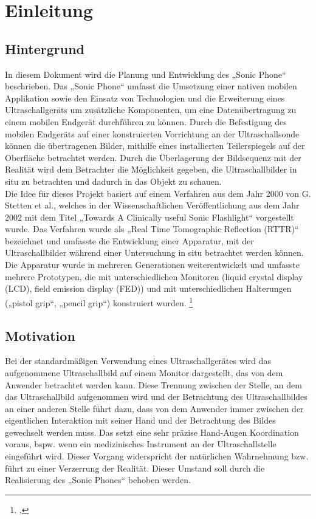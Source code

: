 \chapter{Einleitung}
\section{Hintergrund}
In diesem Dokument wird die Planung und Entwicklung des „Sonic Phone“ beschrieben. Das „Sonic Phone“ umfasst die Umsetzung einer nativen mobilen Applikation sowie den Einsatz von Technologien und die Erweiterung eines Ultraschallgeräts um zusätzliche Komponenten, um eine Datenübertragung zu einem mobilen Endgerät durchführen zu können. Durch die Befestigung des mobilen Endgeräts auf einer konstruierten Vorrichtung an der Ultraschallsonde können die übertragenen Bilder, mithilfe eines installierten Teilerspiegels auf der Oberfläche betrachtet werden. Durch die Überlagerung der Bildsequenz mit der Realität wird dem Betrachter die Möglichkeit gegeben, die Ultraschallbilder in situ zu betrachten und dadurch in das Objekt zu schauen.\\
Die Idee für dieses Projekt basiert auf einem Verfahren aus dem Jahr 2000 von G. Stetten et al., welches in der Wissenschaftlichen Veröffentlichung aus dem Jahr 2002 mit dem Titel „Towards A Clinically useful Sonic Flashlight“ vorgestellt wurde. Das Verfahren wurde als „Real Time Tomographic Reflection (RTTR)“ bezeichnet und umfasste die Entwicklung einer Apparatur, mit der Ultraschallbilder während einer Untersuchung in situ  betrachtet werden können. Die Apparatur wurde in mehreren Generationen weiterentwickelt und umfasste mehrere Prototypen, die mit unterschiedlichen Monitoren (liquid crystal display (LCD), field emission display (FED)) und mit unterschiedlichen Halterungen („pistol grip“, „pencil grip“) konstruiert wurden. \footcite{SonicFlashlight} 

\section{Motivation}
Bei der standardmäßigen Verwendung eines Ultraschallgerätes wird das aufgenommene Ultraschallbild auf einem Monitor dargestellt, das von dem Anwender betrachtet werden kann. Diese Trennung zwischen der Stelle, an dem das Ultraschallbild aufgenommen wird und der Betrachtung des Ultraschallbildes an einer anderen Stelle führt dazu, dass von dem Anwender immer zwischen der eigentlichen Interaktion mit seiner Hand und der Betrachtung des Bildes gewechselt werden muss. Das setzt eine sehr präzise Hand-Augen Koordination voraus, bspw. wenn ein medizinisches Instrument an der Ultraschallstelle eingeführt wird. Dieser Vorgang widerspricht der natürlichen Wahrnehmung bzw. führt zu einer Verzerrung der Realität. Dieser Umstand soll durch die Realisierung des „Sonic Phones“ behoben werden.
